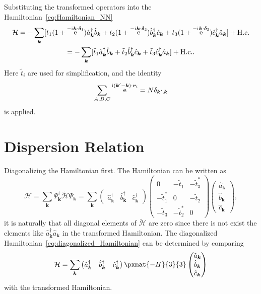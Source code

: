 \documentclass[ preprint, numerical, superscriptaddress, svgnames,
                amssymb, aps, prb ]{revtex4-2}
\DeclareRobustCommand \iu {\mathrm i\mkern1mu}
\DeclareMathOperator \upe {e}
\renewcommand *\theequation{\arabic{section}.\arabic{equation}}
\begin{document}
Substituting the transformed operators into the
Hamiltonian~\eqref{eq:Hamiltonian_NN}
\begin{multline*}
  \mathcal H = -\sum_{\bm k} [
    t_1(1 + \upe^{-\iu \bm k\cdot\bm\delta_1})
    \hat a_{\bm k}^\dagger \hat b_{\bm k}
  + t_2(1 + \upe^{-\iu \bm k\cdot\bm\delta_2})
    \hat b_{\bm k}^\dagger \hat c_{\bm k}
  + t_3(1 + \upe^{-\iu \bm k\cdot\bm\delta_3})
    \hat c_{\bm k}^\dagger \hat a_{\bm k}]
  + \text{H.c.}\\
= -\sum_{\bm k}[\tilde t_1 \hat a_{\bm k}^\dagger \hat b_{\bm k}
              + \tilde t_2 \hat b_{\bm k}^\dagger \hat c_{\bm k}
              + \tilde t_3 \hat c_{\bm k}^\dagger \hat a_{\bm k}]
  + \text{H.c.}.
\end{multline*}
Here $\tilde t_i$ are used for simplification, and the identity
\[
  \sum_{A,B,C} \upe^{\iu(\bm k' - \bm k)\cdot\bm r_i} = N\delta_{\bm k',\bm k}
\]
is applied.
\section{Dispersion Relation}

Diagonalizing the Hamiltonian first. The Hamiltonian can be written as
\begin{equation}
  \mathcal H = \sum_{\bm k} \Psi_{\bm k}^\dagger \tilde{\mathcal H} \Psi_{\bm k}
= \sum_{\bm k}
  \begin{pmatrix}
    \hat a_{\bm k}^\dagger & \hat b_{\bm k}^\dagger & \hat c_{\bm k}^\dagger
  \end{pmatrix}
  \begin{pmatrix}
    0 & -\tilde t_1 & -\tilde t_3^*\\
    -\tilde t_1^* & 0 & -\tilde t_2\\
    -\tilde t_3 & -\tilde t_2^* & 0
  \end{pmatrix}
  \begin{pmatrix}
    \hat a_{\bm k}\\ \hat b_{\bm k}\\ \hat c_{\bm k}
  \end{pmatrix},
  \label{eq:diagonalized_Hamiltonian}
\end{equation}
it is naturally that all diagonal elements of $\tilde{\mathcal H}$ are zero
since there is not exist the elements
like $\hat a_{\bm k}^\dagger \hat a_{\bm k}$ in the transformed Hamiltonian.
The diagonalized Hamiltonian~\eqref{eq:diagonalized_Hamiltonian} can be
determined by comparing
\[
  \mathcal H =
  \sum_{\bm k}
  \begin{pmatrix}
    \hat a_{\bm k}^\dagger & \hat b_{\bm k}^\dagger & \hat c_{\bm k}^\dagger
  \end{pmatrix}
  \pxmat{-H}{3}{3}
  \begin{pmatrix}
    \hat a_{\bm k}\\ \hat b_{\bm k}\\ \hat c_{\bm k}
  \end{pmatrix}
\]
with the transformed Hamiltonian.
\end{document}
